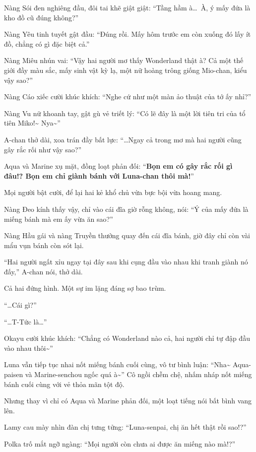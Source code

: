 \documentclass[../main.tex]{subfiles}
\begin{document}
Nàng Sói đen nghiêng đầu, đôi tai khẽ giật giật: ``Tầng hầm à\dots\ À, ý mấy đứa là kho đồ cũ đúng không?''

Nàng Yêu tinh tuyết gật đầu: ``Đúng rồi. Mấy hôm trước em còn xuống đó lấy ít đồ, chẳng có gì đặc biệt cả.''

Nàng Miêu nhún vai: ``Vậy hai người mơ thấy Wonderland thật à? Cả một thế giới đầy màu sắc, mấy sinh vật kỳ lạ, một nữ hoàng trông giống Mio-chan, kiểu vậy sao?''

Nàng Cáo xiếc cười khúc khích: ``Nghe cứ như một màn ảo thuật của tớ ấy nhỉ?''

Nàng Vu nữ khoanh tay, gật gù vẻ triết lý: ``Có lẽ đây là một lời tiên tri của tổ tiên Miko!\~{} Nya\~{}''

A-chan thở dài, xoa trán đầy bất lực: ``\dots Ngay cả trong mơ mà hai người cũng gây rắc rối như vậy sao?''

Aqua và Marine xụ mặt, đồng loạt phản đối: ``\textbf{Bọn em có gây rắc rối gì đâu!? Bọn em chỉ giành bánh với Luna-chan thôi mà!}''

Mọi người bật cười, để lại hai kẻ khổ chủ vừa bực bội vừa hoang mang.

Nàng Đeo kính thấy vậy, chỉ vào cái đĩa giờ rỗng không, nói: ``Ý của mấy đứa là miếng bánh mà em ấy vừa ăn sao?''

Nàng Hầu gái và nàng Truyền thưởng quay đến cái đĩa bánh, giờ đây chỉ còn vài mẩu vụn bánh còn sót lại.

``Hai người ngất xỉu ngay tại đây sau khi cụng đầu vào nhau khi tranh giành nó đấy,''  A-chan nói, thở dài.

Cả hai đứng hình. Một sự im lặng đáng sợ bao trùm.

``\dots Cái gì?''

``\dots T-Tức là\dots''

Okayu cười khúc khích: ``Chẳng có Wonderland nào cả, hai người chỉ tự đập đầu vào nhau thôi\~{}''

Luna vẫn tiếp tục nhai nốt miếng bánh cuối cùng, vô tư bình luận: ``Nha\~{} Aqua-paisen và Marine-senchou ngốc quá à\~{}'' Cô ngồi chễm chệ,  nhấm nháp nốt miếng bánh cuối cùng với vẻ thỏa mãn tột độ.

Nhưng thay vì chỉ có Aqua và Marine phản đối, một loạt tiếng nói bất bình vang lên.

Lamy cau mày nhìn đàn chị tưng tửng: ``Luna-senpai, chị ăn hết thật rồi sao!?''

Polka trố mắt ngỡ ngàng: ``Mọi người còn chưa ai được ăn miếng nào mà!?''
\end{document}
